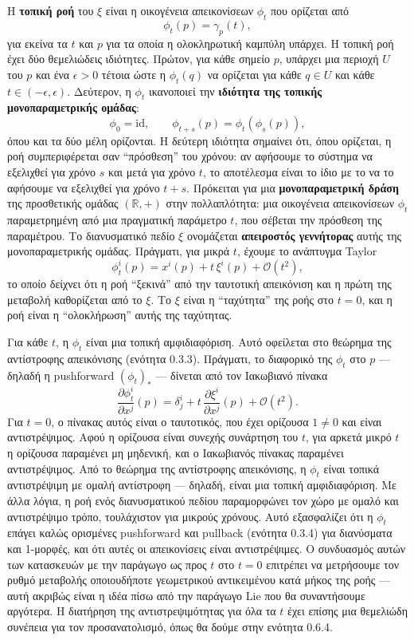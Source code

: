 \documentclass[11pt,a4paper,twoside,openright]{book}
\begin{document}
Η \textbf{τοπική ροή} του $\xi$ είναι η οικογένεια απεικονίσεων $\phi_t$ που ορίζεται από
\[
\phi_t(p) = \gamma_p(t),
\]
για εκείνα τα $t$ και $p$ για τα οποία η ολοκληρωτική καμπύλη υπάρχει. Η τοπική ροή έχει δύο θεμελιώδεις ιδιότητες. Πρώτον, για κάθε σημείο $p$, υπάρχει μια περιοχή $U$ του $p$ και ένα $\epsilon > 0$ τέτοια ώστε η $\phi_t(q)$ να ορίζεται για κάθε $q \in U$ και κάθε $t \in (-\epsilon, \epsilon)$. Δεύτερον, η $\phi_t$ ικανοποιεί την \textbf{ιδιότητα της τοπικής μονοπαραμετρικής ομάδας}:
\[
\phi_0 = \text{id}, \qquad \phi_{t+s}(p) = \phi_t(\phi_s(p)),
\]
όπου και τα δύο μέλη ορίζονται. Η δεύτερη ιδιότητα σημαίνει ότι, όπου ορίζεται, η ροή συμπεριφέρεται σαν ``πρόσθεση'' του χρόνου: αν αφήσουμε το σύστημα να εξελιχθεί για χρόνο $s$ και μετά για χρόνο $t$, το αποτέλεσμα είναι το ίδιο με το να το αφήσουμε να εξελιχθεί για χρόνο $t+s$. Πρόκειται για μια \textbf{μονοπαραμετρική δράση} της προσθετικής ομάδας $(\mathbb{R}, +)$ στην πολλαπλότητα: μια οικογένεια απεικονίσεων $\phi_t$ παραμετρημένη από μια πραγματική παράμετρο $t$, που σέβεται την πρόσθεση της παραμέτρου. Το διανυσματικό πεδίο $\xi$ ονομάζεται \textbf{απειροστός γεννήτορας} αυτής της μονοπαραμετρικής ομάδας. Πράγματι, για μικρά $t$, έχουμε το ανάπτυγμα Taylor
\[
\phi_t^i(p) = x^i(p) + t \, \xi^i(p) + \mathcal{O}(t^2), \tag{0.21}
\]
το οποίο δείχνει ότι η ροή ``ξεκινά'' από την ταυτοτική απεικόνιση και η πρώτη της μεταβολή καθορίζεται από το $\xi$. Το $\xi$ είναι η ``ταχύτητα'' της ροής στο $t=0$, και η ροή είναι η ``ολοκλήρωση'' αυτής της ταχύτητας.

Για κάθε $t$, η $\phi_t$ είναι μια τοπική αμφιδιαφόριση. Αυτό οφείλεται στο θεώρημα της αντίστροφης απεικόνισης (ενότητα 0.3.3). Πράγματι, το διαφορικό της $\phi_t$ στο $p$ --- δηλαδή η pushforward $(\phi_t)_*$ --- δίνεται από τον Ιακωβιανό πίνακα
\[
\frac{\partial \phi_t^i}{\partial x^j}(p) = \delta^i_j + t \, \frac{\partial \xi^i}{\partial x^j}(p) + \mathcal{O}(t^2).
\]
Για $t = 0$, ο πίνακας αυτός είναι ο ταυτοτικός, που έχει ορίζουσα $1 \neq 0$ και είναι αντιστρέψιμος. Αφού η ορίζουσα είναι συνεχής συνάρτηση του $t$, για αρκετά μικρό $t$ η ορίζουσα παραμένει μη μηδενική, και ο Ιακωβιανός πίνακας παραμένει αντιστρέψιμος. Από το θεώρημα της αντίστροφης απεικόνισης, η $\phi_t$ είναι τοπικά αντιστρέψιμη με ομαλή αντίστροφη --- δηλαδή, είναι μια τοπική αμφιδιαφόριση. Με άλλα λόγια, η ροή ενός διανυσματικού πεδίου παραμορφώνει τον χώρο με ομαλό και αντιστρέψιμο τρόπο, τουλάχιστον για μικρούς χρόνους. Αυτό εξασφαλίζει ότι η $\phi_t$ επάγει καλώς ορισμένες pushforward και pullback (ενότητα 0.3.4) για διανύσματα και 1-μορφές, και ότι αυτές οι απεικονίσεις είναι αντιστρέψιμες. Ο συνδυασμός αυτών των κατασκευών με την παράγωγο ως προς $t$ στο $t=0$ επιτρέπει να μετρήσουμε τον ρυθμό μεταβολής οποιουδήποτε γεωμετρικού αντικειμένου κατά μήκος της ροής --- αυτή ακριβώς είναι η ιδέα πίσω από την παράγωγο Lie που θα συναντήσουμε αργότερα. Η διατήρηση της αντιστρεψιμότητας για όλα τα $t$ έχει επίσης μια θεμελιώδη συνέπεια για τον προσανατολισμό, όπως θα δούμε στην ενότητα 0.6.4.
\end{document}
